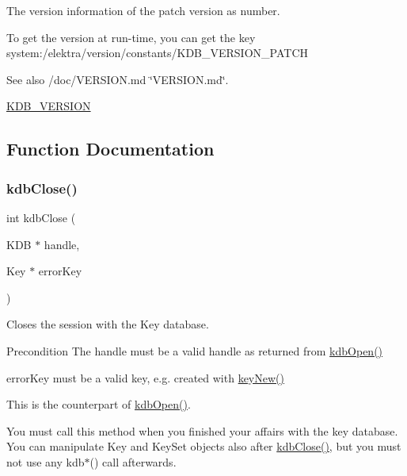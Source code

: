 The version information of the patch version as number. 

To get the version at run-\/time, you can get the key system\+:/elektra/version/constants/\+K\+D\+B\+\_\+\+V\+E\+R\+S\+I\+O\+N\+\_\+\+P\+A\+T\+CH

\begin{DoxySeeAlso}{See also}
/doc/\+V\+E\+R\+S\+I\+ON.md \char`\"{}\+V\+E\+R\+S\+I\+O\+N.\+md\char`\"{}. 

\hyperlink{group__kdb_ga2f8953fe5f9f28db54b3ef678ebf40d7}{K\+D\+B\+\_\+\+V\+E\+R\+S\+I\+ON} 
\end{DoxySeeAlso}


\subsection{Function Documentation}
\mbox{\label{group__kdb_gadb54dc9fda17ee07deb9444df745c96f}} 
\subsubsection{\texorpdfstring{kdb\+Close()}{kdbClose()}}
{\footnotesize\ttfamily int kdb\+Close (\begin{DoxyParamCaption}\item[{K\+DB $\ast$}]{handle,  }\item[{Key $\ast$}]{error\+Key }\end{DoxyParamCaption})}



Closes the session with the Key database. 

\begin{DoxyPrecond}{Precondition}
The handle must be a valid handle as returned from \hyperlink{group__kdb_ga844e1299a84c3fbf1d3a905c5c893ba5}{kdb\+Open()}

error\+Key must be a valid key, e.\+g. created with \hyperlink{group__key_gad23c65b44bf48d773759e1f9a4d43b89}{key\+New()}
\end{DoxyPrecond}
This is the counterpart of \hyperlink{group__kdb_ga844e1299a84c3fbf1d3a905c5c893ba5}{kdb\+Open()}.

You must call this method when you finished your affairs with the key database. You can manipulate Key and Key\+Set objects also after \hyperlink{group__kdb_gadb54dc9fda17ee07deb9444df745c96f}{kdb\+Close()}, but you must not use any kdb$\ast$() call afterwards.

